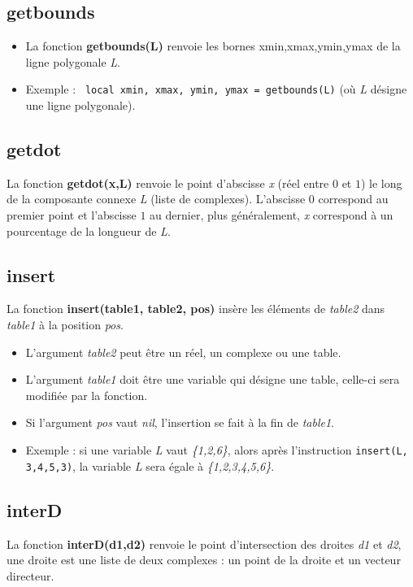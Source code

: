 \documentclass[%
10pt,%
a4paper,%
french,%
]%
{article}%
\begin{document}
\subsection{getbounds}
\begin{itemize}
    \item La fonction \textbf{getbounds(L)} renvoie les bornes xmin,xmax,ymin,ymax de la ligne polygonale \emph{L}.
    \item Exemple : \texttt{ local xmin, xmax, ymin, ymax = getbounds(L)} (où \emph{L} désigne une ligne polygonale).
\end{itemize}

\subsection{getdot}
La fonction \textbf{getdot(x,L)} renvoie le point d'abscisse \emph{x} (réel entre $0$ et $1$) le long de la composante connexe \emph{L} (liste de complexes). L'abscisse $0$ correspond au premier point et l'abscisse $1$ au dernier, plus généralement, \emph{x} correspond à un pourcentage de la longueur de \emph{L}.

\subsection{insert}
La fonction \textbf{insert(table1, table2, pos)} insère les éléments de \emph{table2} dans \emph{table1} à la position \emph{pos}.

\begin{itemize}
    \item L'argument \emph{table2} peut être un réel, un complexe ou une table.
    \item L'argument \emph{table1} doit être une variable qui désigne une table, celle-ci sera modifiée par la fonction.
    \item Si l'argument \emph{pos} vaut \emph{nil}, l'insertion se fait à la fin de \emph{table1}.
    \item Exemple : si une variable \emph{L} vaut \emph{\{1,2,6\}}, alors après l'instruction \texttt{insert(L, {3,4,5},3)}, la variable \emph{L} sera égale à \emph{\{1,2,3,4,5,6\}}.
\end{itemize}

\subsection{interD}
La fonction \textbf{interD(d1,d2)} renvoie le point d'intersection des droites \emph{d1} et \emph{d2}, une droite est une liste de deux complexes : un point de la droite et un vecteur directeur.
\end{document}
